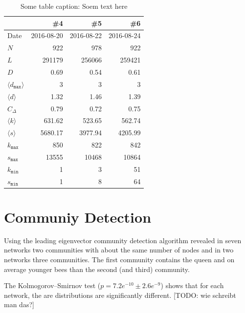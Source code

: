 \begin{table}
\centering
\begin{tabular}{lrrr}
\toprule
{} &        \#4 &        \#5 &        \#6 \\
\midrule
Date             &     2016-08-20 &     2016-08-22 &     2016-08-24 \\
$N$            &      922 &      978 &      922 \\
$L$            &   291179 &   256066 &   259421 \\
$D$          &     0.69 &     0.54 &     0.61 \\
$\langle d_{\texttt{max}} \rangle$         &        3 &        3 &        3 \\
$\langle d \rangle$ &     1.32 &     1.46 &     1.39 \\
$C_\Delta$              &     0.79 &     0.72 &     0.75 \\
$ \langle k \rangle$       &   631.62 &   523.65 &   562.74 \\
$ \langle s \rangle$       &  5680.17 &  3977.94 &  4205.99 \\
$k_{\texttt{max}}$           &      850 &      822 &      842 \\
$s_{\texttt{max}}$          &    13555 &    10468 &    10864 \\
 $k_{\texttt{min}}$           &        1 &        3 &       51 \\
$s_{\texttt{min}}$          &        1 &        8 &       64 \\
\bottomrule
\end{tabular}
\caption{Some table caption: Soem text here}
\label{tab:stats}
\end{table}


\section{Communiy Detection}

Using the leading eigenvector community detection algorithm revealed in seven networks two communities with about the same number of nodes and in two networks three communities. The first community contains the queen and on average younger bees than the second (and third) community.

The Kolmogorov–Smirnov  test ($p=7.2e^{-10} \pm2.6e^{-9}$) shows that for each network, the are distributions are significantly different. [TODO: wie schreibt man das?]

